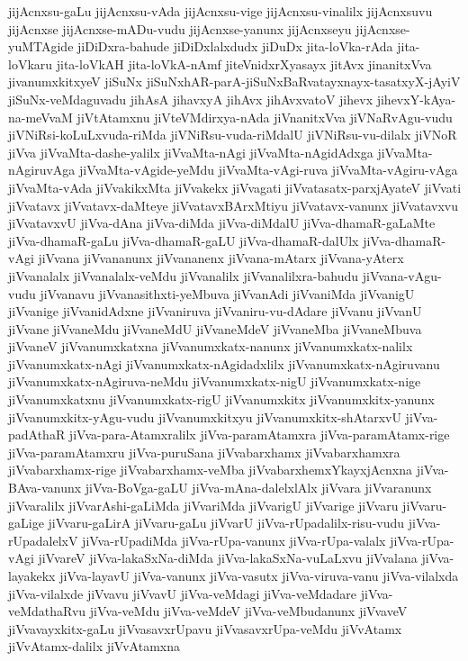 {jijAcnxsu-gaLu
jijAcnxsu-vAda
jijAcnxsu-vige
jijAcnxsu-vinalilx
jijAcnxsuvu
jijAcnxse
jijAcnxse-mADu-vudu
jijAcnxse-yanunx
jijAcnxseyu
jijAcnxse-yuMTAgide
jiDiDxra-bahude
jiDiDxlalxdudx
jiDuDx
jita-loVka-rAda
jita-loVkaru
jita-loVkAH
jita-loVkA-nAmf
jiteVnidxrXyasayx
jitAvx
jinanitxVva
jivanumxkitxyeV
jiSuNx
jiSuNxhAR-parA-jiSuNxBaRvatayxnayx-tasatxyX-jAyiV
jiSuNx-veMdaguvadu
jihAsA
jihavxyA
jihAvx
jihAvxvatoV
jihevx
jihevxY-kAya-na-meVvaM
jiVtAtamxnu
jiVteVMdirxya-nAda
jiVnanitxVva
jiVNaRvAgu-vudu
jiVNiRsi-koLuLxvuda-riMda
jiVNiRsu-vuda-riMdalU
jiVNiRsu-vu-dilalx
jiVNoR
jiVva
jiVvaMta-dashe-yalilx
jiVvaMta-nAgi
jiVvaMta-nAgidAdxga
jiVvaMta-nAgiruvAga
jiVvaMta-vAgide-yeMdu
jiVvaMta-vAgi-ruva
jiVvaMta-vAgiru-vAga
jiVvaMta-vAda
jiVvakikxMta
jiVvakekx
jiVvagati
jiVvatasatx-parxjAyateV
jiVvati
jiVvatavx
jiVvatavx-daMteye
jiVvatavxBArxMtiyu
jiVvatavx-vanunx
jiVvatavxvu
jiVvatavxvU
jiVva-dAna
jiVva-diMda
jiVva-diMdalU
jiVva-dhamaR-gaLaMte
jiVva-dhamaR-gaLu
jiVva-dhamaR-gaLU
jiVva-dhamaR-dalUlx
jiVva-dhamaR-vAgi
jiVvana
jiVvananunx
jiVvananenx
jiVvana-mAtarx
jiVvana-yAterx
jiVvanalalx
jiVvanalalx-veMdu
jiVvanalilx
jiVvanalilxra-bahudu
jiVvana-vAgu-vudu
jiVvanavu
jiVvanasithxti-yeMbuva
jiVvanAdi
jiVvaniMda
jiVvanigU
jiVvanige
jiVvanidAdxne
jiVvaniruva
jiVvaniru-vu-dAdare
jiVvanu
jiVvanU
jiVvane
jiVvaneMdu
jiVvaneMdU
jiVvaneMdeV
jiVvaneMba
jiVvaneMbuva
jiVvaneV
jiVvanumxkatxna
jiVvanumxkatx-nanunx
jiVvanumxkatx-nalilx
jiVvanumxkatx-nAgi
jiVvanumxkatx-nAgidadxlilx
jiVvanumxkatx-nAgiruvanu
jiVvanumxkatx-nAgiruva-neMdu
jiVvanumxkatx-nigU
jiVvanumxkatx-nige
jiVvanumxkatxnu
jiVvanumxkatx-rigU
jiVvanumxkitx
jiVvanumxkitx-yanunx
jiVvanumxkitx-yAgu-vudu
jiVvanumxkitxyu
jiVvanumxkitx-shAtarxvU
jiVva-padAthaR
jiVva-para-Atamxralilx
jiVva-paramAtamxra
jiVva-paramAtamx-rige
jiVva-paramAtamxru
jiVva-puruSana
jiVvabarxhamx
jiVvabarxhamxra
jiVvabarxhamx-rige
jiVvabarxhamx-veMba
jiVvabarxhemxYkayxjAcnxna
jiVva-BAva-vanunx
jiVva-BoVga-gaLU
jiVva-mAna-dalelxlAlx
jiVvara
jiVvaranunx
jiVvaralilx
jiVvarAshi-gaLiMda
jiVvariMda
jiVvarigU
jiVvarige
jiVvaru
jiVvaru-gaLige
jiVvaru-gaLirA
jiVvaru-gaLu
jiVvarU
jiVva-rUpadalilx-risu-vudu
jiVva-rUpadalelxV
jiVva-rUpadiMda
jiVva-rUpa-vanunx
jiVva-rUpa-valalx
jiVva-rUpa-vAgi
jiVvareV
jiVva-lakaSxNa-diMda
jiVva-lakaSxNa-vuLaLxvu
jiVvalana
jiVva-layakekx
jiVva-layavU
jiVva-vanunx
jiVva-vasutx
jiVva-viruva-vanu
jiVva-vilalxda
jiVva-vilalxde
jiVvavu
jiVvavU
jiVva-veMdagi
jiVva-veMdadare
jiVva-veMdathaRvu
jiVva-veMdu
jiVva-veMdeV
jiVva-veMbudanunx
jiVvaveV
jiVvavayxkitx-gaLu
jiVvasavxrUpavu
jiVvasavxrUpa-veMdu
jiVvAtamx
jiVvAtamx-dalilx
jiVvAtamxna
}
